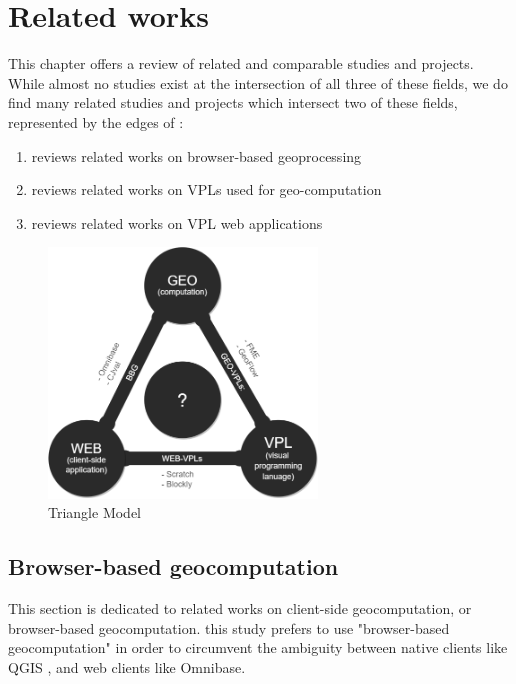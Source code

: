 \chapter{Related works}
\label{chap:related}

This chapter offers a review of related and comparable studies and projects.
While almost no studies exist at the intersection of all three of these fields, we do find many related studies and projects which intersect two of these fields, represented by the edges of :
\begin{enumerate}[-]
  \item {} reviews related works on browser-based geoprocessing
  \item {} reviews related works on VPLs used for geo-computation
  \item {} reviews related works on VPL web applications
\end{enumerate}

\begin{figure}
  \centering
  \graphicspath{ {../../assets/diagrams/} }
  \includegraphics[width=270px]{geo-web-vpl.png}
  \caption{Triangle Model}
  \label{fig:triangle-model}
\end{figure}

\section{Browser-based geocomputation}
\label{sec:related-geoweb}

This section is dedicated to related works on client-side geocomputation, or browser-based geocomputation. 
this study prefers to use "browser-based geocomputation" in order to circumvent the ambiguity between native clients like QGIS \cite{qgis_community_qgis_2022}, and web clients like Omnibase.

